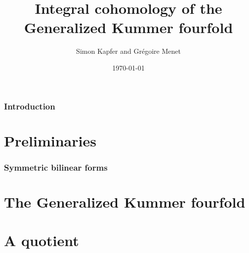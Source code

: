 \documentclass[a4paper]{article}
\begin{document}
\title{\bf Integral cohomology of the Generalized Kummer fourfold}


\author{Simon Kapfer and Gr\'egoire Menet}


\date{\today}

\maketitle
\section{Introduction}
\part{Preliminaries}
\section{Symmetric bilinear forms}






\part{The Generalized Kummer fourfold}\label{integralcohomology}




\part{A quotient}\label{quotient}



\end{document}
